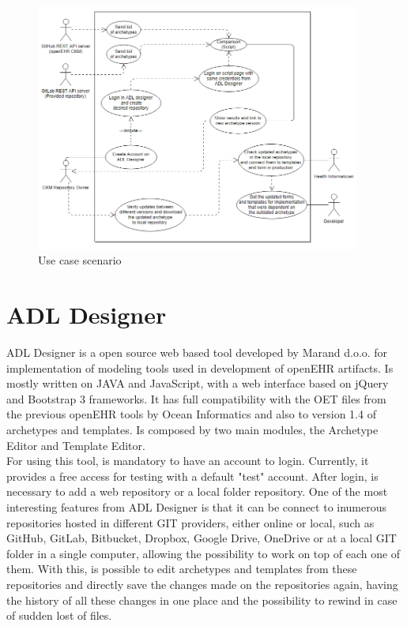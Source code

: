 \documentclass[mim_thesis.tex]{subfiles}
\begin{document}
\begin{figure}[H]
	\centering
    \includegraphics[width=0.95\textwidth]{img/usecase2.PNG}
	\caption{Use case scenario}
	\label{fig:use_case}
\end{figure}


\newpage
\section{ADL Designer}
ADL Designer is a open source web based tool developed by Marand d.o.o. for implementation of modeling tools used in development of openEHR artifacts. Is mostly written on JAVA and JavaScript, with a web interface based on jQuery and Bootstrap 3 frameworks. It has full compatibility with the OET files from the previous openEHR tools by Ocean Informatics and also to version 1.4 of archetypes and templates. Is composed by two main modules, the Archetype Editor and Template Editor. \\

For using this tool, is mandatory to have an account to login. Currently, it provides a free access for testing with a default "test" account. After login, is necessary to add a web repository or a local folder repository. One of the most interesting features from ADL Designer is that it can be connect to inumerous repositories hosted in different GIT providers, either online or local, such as GitHub, GitLab, Bitbucket, Dropbox, Google Drive, OneDrive or at a local GIT folder in a single computer, allowing the possibility to work on top of each one of them. With this, is possible to edit archetypes and templates from these repositories and directly save the changes made on the repositories again, having the history of all these changes in one place and the possibility to rewind in case of sudden lost of files.
\end{document}
